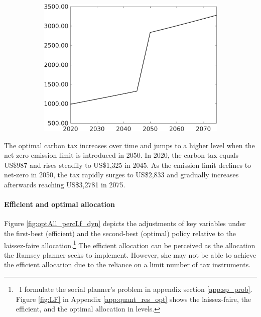 \begin{figure}[h!!]
\begin{subfigure}{0.4\textwidth}
		\includegraphics[width=1\textwidth]{../../codding_model/own_basedOnFried/optimalPol_010922_revision/figures/all_13Sept22_Tplus30/Single_periods12_OPT_T_NoTaus_Tauf_regime4_spillover0_knspil0_noskill0_sep0_xgrowth0_extern0_PV1_sizeequ0_GOV0_etaa0.79.png}
	\end{subfigure}
\end{figure} 
 The optimal carbon tax increases over time and jumps to a higher level when the net-zero emission limit is introduced in 2050.
In 2020, the carbon tax equals US\$987 and rises steadily to US\$1,325 in 2045.  As the emission limit declines to net-zero in 2050, the tax rapidly surges to US\$2,833 and gradually increases afterwards reaching US\$3,2781 in 2075. 
\paragraph{Efficient and optimal allocation}\label{subsec:notaul}

Figure \ref{fig:optAll_percLf_dyn} depicts the adjustments of key variables under the first-best (efficient) and the second-best (optimal) policy relative to the laissez-faire allocation.\footnote{\ I formulate the social planner's problem in appendix section \ref{app:sp_prob}.  Figure \ref{fig:LF} in Appendix \ref{app:quant_res_opt} shows the laissez-faire, the efficient, and the optimal allocation in levels.} 
The efficient allocation can be perceived as the allocation the Ramsey planner seeks to implement. However, she may not be able to achieve the efficient allocation due to the reliance on a limit number of tax instruments.

